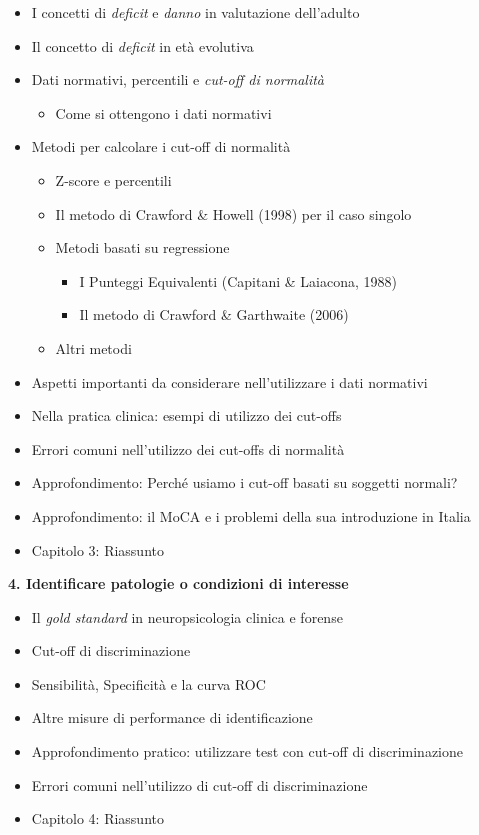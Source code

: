 \documentclass[
  italian,
  letterpaper,
  paper=6in:9in,
  pagesize=pdftex,
  headinclude=on,
  footinclude=on,
  11pt]{scrbook}
\providecommand{\tightlist}{%
  \setlength{\itemsep}{0pt}\setlength{\parskip}{0pt}}
\begin{document}
\begin{itemize}
\tightlist
\item
  I concetti di \emph{deficit} e \emph{danno} in valutazione dell'adulto
\item
  Il concetto di \emph{deficit} in età evolutiva
\item
  Dati normativi, percentili e \emph{cut-off di normalità}

  \begin{itemize}
  \tightlist
  \item
    Come si ottengono i dati normativi
  \end{itemize}
\item
  Metodi per calcolare i cut-off di normalità

  \begin{itemize}
  \tightlist
  \item
    Z-score e percentili
  \item
    Il metodo di Crawford \& Howell (1998) per il caso singolo
  \item
    Metodi basati su regressione

    \begin{itemize}
    \tightlist
    \item
      I Punteggi Equivalenti (Capitani \& Laiacona, 1988)
    \item
      Il metodo di Crawford \& Garthwaite (2006)
    \end{itemize}
  \item
    Altri metodi
  \end{itemize}
\item
  Aspetti importanti da considerare nell'utilizzare i dati normativi
\item
  Nella pratica clinica: esempi di utilizzo dei cut-offs
\item
  Errori comuni nell'utilizzo dei cut-offs di normalità
\item
  Approfondimento: Perché usiamo i cut-off basati su soggetti normali?
\item
  Approfondimento: il MoCA e i problemi della sua introduzione in Italia
\item
  Capitolo 3: Riassunto
\end{itemize}

\textbf{4. Identificare patologie o condizioni di interesse}

\begin{itemize}
\tightlist
\item
  Il \emph{gold standard} in neuropsicologia clinica e forense
\item
  Cut-off di discriminazione
\item
  Sensibilità, Specificità e la curva ROC
\item
  Altre misure di performance di identificazione
\item
  Approfondimento pratico: utilizzare test con cut-off di
  discriminazione
\item
  Errori comuni nell'utilizzo di cut-off di discriminazione
\item
  Capitolo 4: Riassunto
\end{itemize}
\end{document}
